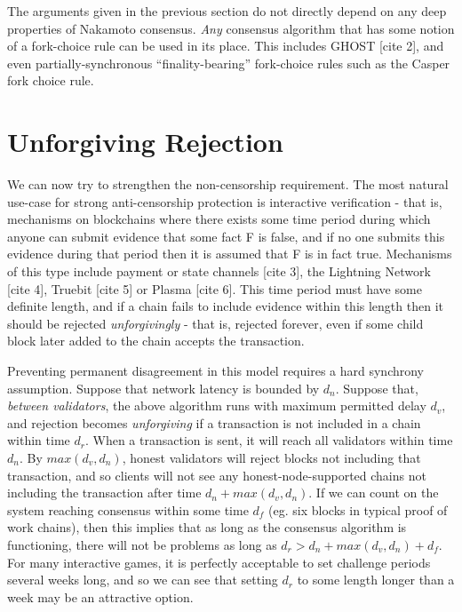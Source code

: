 \documentclass[12pt]{article}
\begin{document}
The arguments given in the previous section do not directly depend on any deep properties of Nakamoto consensus. \textit{Any} consensus algorithm that has some notion of a fork-choice rule can be used in its place. This includes GHOST [cite 2], and even partially-synchronous ``finality-bearing'' fork-choice rules such as the Casper fork choice rule.

\section{Unforgiving Rejection}

We can now try to strengthen the non-censorship requirement. The most natural use-case for strong anti-censorship protection is interactive verification - that is, mechanisms on blockchains where there exists some time period during which anyone can submit evidence that some fact F is false, and if no one submits this evidence during that period then it is assumed that F is in fact true. Mechanisms of this type include payment or state channels [cite 3], the Lightning Network [cite 4], Truebit [cite 5] or Plasma [cite 6]. This time period must have some definite length, and if a chain fails to include evidence within this length then it should be rejected \textit{unforgivingly} - that is, rejected forever, even if some child block later added to the chain accepts the transaction.

Preventing permanent disagreement in this model requires a hard synchrony assumption. Suppose that network latency is bounded by $d_n$. Suppose that, \textit{between validators}, the above algorithm runs with maximum permitted delay $d_v$, and rejection becomes \textit{unforgiving} if a transaction is not included in a chain within time $d_r$. When a transaction is sent, it will reach all validators within time $d_n$. By $max(d_v, d_n)$, honest validators will reject blocks not including that transaction, and so clients will not see any honest-node-supported chains not including the transaction after time $d_n + max(d_v, d_n)$. If we can count on the system reaching consensus within some time $d_f$ (eg. six blocks in typical proof of work chains), then this implies that as long as the consensus algorithm is functioning, there will not be problems as long as $d_r > d_n + max(d_v, d_n) + d_f$. For many interactive games, it is perfectly acceptable to set challenge periods several weeks long, and so we can see that setting $d_r$ to some length longer than a week may be an attractive option.
\end{document}
